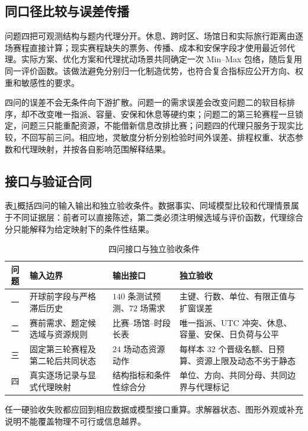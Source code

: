 \subsection{同口径比较与误差传播}

问题四把可观测结构与题内代理分开。休息、跨时区、场馆日和实际旅行距离由逐场赛程直接计算；现实赛程缺失的票务、传播、成本和安保字段才使用最近邻代理。实际方案、优化方案和代理扰动场景共同确定一次 Min--Max 包络，随后复用同一评价函数。该做法避免分别归一化制造优势，也符合复合指标应公开方向、权重和敏感性的要求。

四问的误差不会无条件向下游扩散。问题一的需求误差会改变问题二的软目标排序，却不改变唯一指派、容量、安保和休息等硬约束；问题二的第三轮赛程一旦锁定，问题三只能重配资源，不能借新信息改排比赛；问题四的代理只服务于现实比较，不回写前三问。相应地，灵敏度分析分别检验时间外误差、排程权重、状态参数和代理映射，并按各自影响范围解释结果。

\subsection{接口与验证合同}

表\ref{tab:interfaces}概括四问的输入输出和独立验收条件。数据事实、同域模型比较和代理情景属于不同证据层：前者可以直接陈述，第二类必须注明候选域与评价函数，代理综合分只能解释为给定映射下的条件性结果。

{\small
\setlength{\tabcolsep}{4pt}
\begin{table}[htbp]
\centering
\caption{四问接口与独立验收条件}
\label{tab:interfaces}
\begin{tabularx}{\textwidth}{c>{\raggedright\arraybackslash}X>{\raggedright\arraybackslash}X>{\raggedright\arraybackslash}X}
\toprule
问题 & 输入边界 & 输出接口 & 独立验收 \\
\midrule
一 & 开球前字段与严格滞后历史 & $140$ 条测试预测、$72$ 场需求 & 主键、行数、单位、有限正值与扩窗误差 \\
二 & 赛前需求、题定候选域与资源规则 & 比赛--场馆--时段长表 & 唯一指派、UTC 冲突、休息、容量、安保、日负荷与公平 \\
三 & 固定第三轮赛程及第二轮后共同状态 & $24$ 场动态资源动作 & 每样本 $32$ 个晋级名额、日预算、资源上限及动态不劣于静态 \\
四 & 真实逐场记录与显式代理映射 & 结构指标和条件性综合分 & 单位、方向、共同分母、共同边界与代理标记 \\
\bottomrule
\end{tabularx}
\end{table}
}

任一硬验收失败都应回到相应数据或模型接口重算。求解器状态、图形外观或补充说明不能覆盖物理不可行或信息越界。
